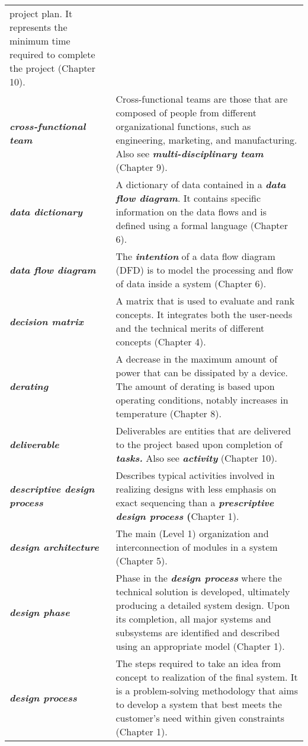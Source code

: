 \begin{longtable}[]{@{}
  >{\raggedright\arraybackslash}p{}
  >{\raggedright\arraybackslash}p{}@{}}
project plan. It represents the minimum time required to complete the
project (Chapter 10). \\
\emph{\textbf{cross-functional team}} & Cross-functional teams are those
that are composed of people from different organizational functions,
such as engineering, marketing, and manufacturing. Also see
\emph{\textbf{multi-disciplinary team}} (Chapter 9). \\
\emph{\textbf{data dictionary}} & A dictionary of data contained in a
\emph{\textbf{data flow diagram}}. It contains specific information on
the data flows and is defined using a formal language (Chapter 6). \\
\emph{\textbf{data flow diagram}} & The \emph{\textbf{intention}} of a
data flow diagram (DFD) is to model the processing and flow of data
inside a system (Chapter 6). \\
\emph{\textbf{decision matrix}} & A matrix that is used to evaluate and
rank concepts. It integrates both the user-needs and the technical
merits of different concepts (Chapter 4). \\
\emph{\textbf{derating}} & A decrease in the maximum amount of power
that can be dissipated by a device. The amount of derating is based upon
operating conditions, notably increases in temperature (Chapter 8). \\
\emph{\textbf{deliverable}} & Deliverables are entities that are
delivered to the project based upon completion of \emph{\textbf{tasks.}}
Also see \emph{\textbf{activity}} (Chapter 10). \\
\emph{\textbf{descriptive design process}} & Describes typical
activities involved in realizing designs with less emphasis on exact
sequencing than a \textbf{\emph{prescriptive design process} (}Chapter
1). \\
\emph{\textbf{design architecture}} & The main (Level 1) organization
and interconnection of modules in a system (Chapter 5). \\
\emph{\textbf{design phase}} & Phase in the \emph{\textbf{design
process}} where the technical solution is developed, ultimately
producing a detailed system design. Upon its completion, all major
systems and subsystems are identified and described using an appropriate
model (Chapter 1). \\
\emph{\textbf{design process}} & The steps required to take an idea from
concept to realization of the final system. It is a problem-solving
methodology that aims to develop a system that best meets the customer's
need within given constraints (Chapter 1). \\

\end{longtable}
